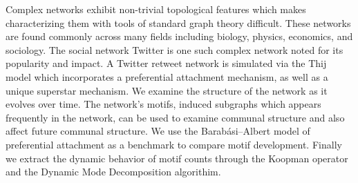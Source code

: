 

Complex networks exhibit non-trivial topological features which makes
characterizing them with tools of standard graph theory difficult. These
networks are found commonly across many fields including biology, physics,
economics, and sociology. The social network Twitter is one such complex 
network noted for its popularity and impact. A Twitter retweet network is simulated
via the Thij model which incorporates a preferential attachment mechanism,
as well as a unique superstar mechanism. We examine the structure of
the network as it evolves over time. The network's motifs, induced subgraphs
which appears frequently in the network, can be used to examine communal
structure and also affect future communal structure. We use the Barabási–Albert model
of preferential attachment as a benchmark to compare motif development. Finally
we extract the dynamic behavior of motif counts through the Koopman operator and the Dynamic
Mode Decomposition algorithim. 
